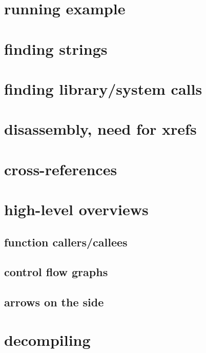 \section{running example}


\section{finding strings}



\section{finding library/system calls}




\section{disassembly, need for xrefs}


\section{cross-references}


\section{high-level overviews}

\subsection{function callers/callees}

\subsection{control flow graphs}


\subsection{arrows on the side}


\section{decompiling}

